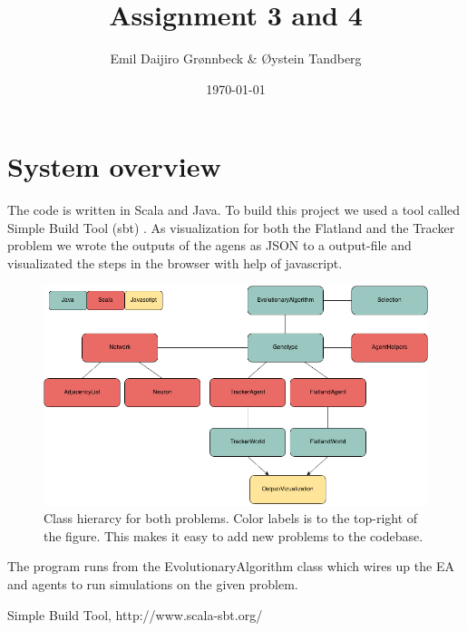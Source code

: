 \documentclass{article}
\begin{document}
\title{Assignment 3 and 4}
\author{Emil Daijiro Grønnbeck \& Øystein Tandberg}
\date{\today}
\maketitle

\section{System overview}
The code is written in Scala and Java. To build this project we used a tool called Simple Build Tool (sbt) \cite{sbt}. As visualization for both the Flatland and the Tracker problem we wrote the outputs of the agens as JSON to a output-file and visualizated the steps in the browser with help of javascript. 

\begin{figure}[h]
  \centering
    \includegraphics[width=1.0\textwidth]{img/class_diagram}
    \caption{Class hierarcy for both problems. Color labels is to the top-right of the figure. This makes it easy to add new problems to the codebase.}
\end{figure}

The program runs from the EvolutionaryAlgorithm class which wires up the EA and agents to run simulations on the given problem. 


\newpage


\begin{thebibliography}{9}
	  Simple Build Tool, http://www.scala-sbt.org/
\end{thebibliography}
\end{document}
